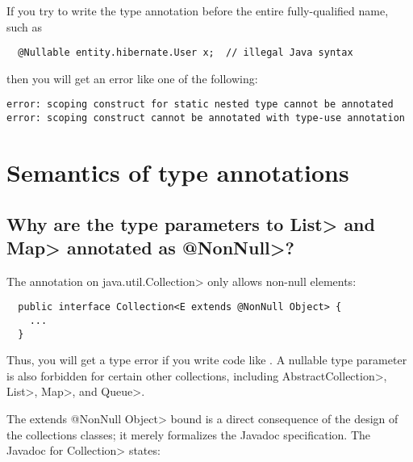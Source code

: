 If you try to write the type annotation before the entire fully-qualified
name, such as
\begin{Verbatim}
  @Nullable entity.hibernate.User x;  // illegal Java syntax
\end{Verbatim}
\noindent
then you will get an error like one of the following:
\begin{Verbatim}
error: scoping construct for static nested type cannot be annotated
error: scoping construct cannot be annotated with type-use annotation
\end{Verbatim}


\section{Semantics of type annotations\label{faq-semantics-section}}


\subsection{Why are the type parameters to \<List> and \<Map> annotated as \<@NonNull>?\label{faq-list-map-nonnull-typeargs}}

The annotation on \<java.util.Collection> only allows non-null elements:

\begin{Verbatim}
  public interface Collection<E extends @NonNull Object> {
    ...
  }
\end{Verbatim}

\noindent
Thus, you will get a type error if you write code like
.
A nullable
type parameter is also forbidden for certain other collections, including
\<AbstractCollection>, \<List>, \<Map>, and \<Queue>.



The \<extends @NonNull Object> bound is a direct consequence of the design
of the collections classes; it merely formalizes the Javadoc specification.
The Javadoc for \<Collection> states:

